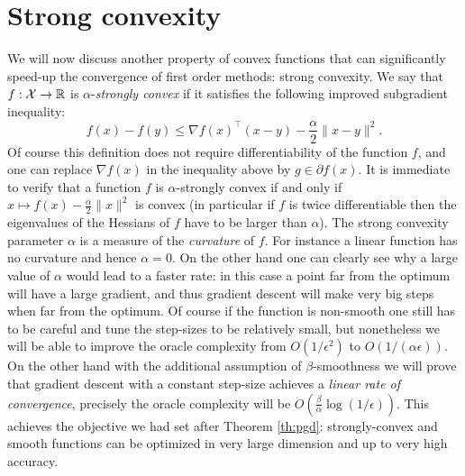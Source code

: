\section{Strong convexity}
We will now discuss another property of convex functions that can significantly speed-up the convergence of first order methods: strong convexity. We say that $f: \mathcal{X} \rightarrow \mathbb{R}$ is $\alpha$-{\em strongly convex} if it satisfies the following improved subgradient inequality:
\begin{equation} \label{eq:defstrongconv}
f(x) - f(y) \leq \nabla f(x)^{\top} (x - y) - \frac{\alpha}{2} \|x - y \|^2 .
\end{equation}
Of course this definition does not require differentiability of the function $f$, and one can replace $\nabla f(x)$ in the inequality above by $g \in \partial f(x)$. It is immediate to verify that a function $f$ is $\alpha$-strongly convex if and only if $x \mapsto f(x) - \frac{\alpha}{2} \|x\|^2$ is convex (in particular if $f$ is twice differentiable then the eigenvalues of the Hessians of $f$ have to be larger than $\alpha$). The strong convexity parameter $\alpha$ is a measure of the {\em curvature} of $f$. For instance a linear function has no curvature and hence $\alpha = 0$. On the other hand one can clearly see why a large value of $\alpha$ would lead to a faster rate: in this case a point far from the optimum will have a large gradient, and thus gradient descent will make very big steps when far from the optimum. Of course if the function is non-smooth one still has to be careful and tune the step-sizes to be relatively small, but nonetheless we will be able to improve the oracle complexity from $O(1/\epsilon^2)$ to $O(1/(\alpha \epsilon))$. On the other hand with the additional assumption of $\beta$-smoothness we will prove that gradient descent with a constant step-size achieves a {\em linear rate of convergence}, precisely the oracle complexity will be $O(\frac{\beta}{\alpha} \log(1/\epsilon))$. This achieves the objective we had set after Theorem \ref{th:pgd}: strongly-convex and smooth functions can be optimized in very large dimension and up to very high accuracy.

